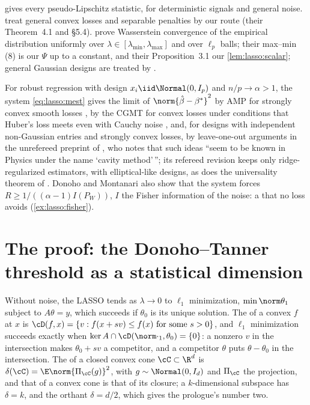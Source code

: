 \begin{refsection}
 gives every pseudo-Lipschitz statistic, for deterministic signals and general noise. \Textcite{ThrampoulidisAbbasiHassibi2018} treat general convex losses and separable penalties by our route (their Theorem~4.1 and \S5.4). \Textcite{MiolaneMontanari2021} prove Wasserstein convergence of the empirical distribution uniformly over $\lambda\in[\lambda_{\min},\lambda_{\max}]$ and over $\ell_p$ balls; their max--min (8) is our $\Psi$ up to a constant, and their Proposition~3.1 our \cref{lem:lasso:scalar}; general Gaussian designs are treated by \textcite{CelentanoMontanariWei2023}.

For robust regression with design $x_i\iid\Normal(0,I_p)$ and $n/p\to\alpha>1$, the system \eqref{eq:lasso:mest} gives the limit of $\norm{\hat\beta-\beta^*}^2$ by AMP for strongly convex smooth losses \parencite[Theorem~4.1]{DonohoMontanari2016}, by the CGMT for convex losses under conditions that Huber's loss meets even with Cauchy noise \parencite[Theorem~4.1, \S5.1]{ThrampoulidisAbbasiHassibi2018}, and, for designs with independent non-Gaussian entries and strongly convex losses, by leave-one-out arguments in the unrefereed preprint of \textcite{ElKaroui2013}, who notes that such ideas ``seem to be known in Physics under the name `cavity method'\,''; its refereed revision \parencite{ElKaroui2018} keeps only ridge-regularized estimators, with elliptical-like designs, as does the universality theorem of \textcite{HanShen2023}. Donoho and Montanari also show that the system forces $R\ge1/((\alpha-1)I(P_W))$, $I$ the Fisher information of the noise: a  that no loss avoids (\cref{ex:lasso:fisher}).

\section{The proof: the Donoho--Tanner threshold as a statistical dimension}\label{sec:lasso:dt}

Without noise, the LASSO tends as $\lambda\to0$ to $\ell_1$ minimization, $\min\norm\theta_1$ subject to $A\theta=y$, which succeeds if $\theta_0$ is its unique solution. The  of a convex $f$ at $x$ is $\cD(f,x)=\{v:f(x+sv)\le f(x)\text{ for some }s>0\}$, and $\ell_1$ minimization succeeds exactly when $\ker A\cap\cD(\norm\cdot_1,\theta_0)=\{0\}$: a nonzero $v$ in the intersection makes $\theta_0+sv$ a competitor, and a competitor $\theta$ puts $\theta-\theta_0$ in the intersection. The  of a closed convex cone $\cC\subset\R^d$ is $\delta(\cC)=\E\norm{\Pi_\cC(g)}^2$, with $g\sim\Normal(0,I_d)$ and $\Pi_\cC$ the projection, and that of a convex cone is that of its closure; a $k$-dimensional subspace has $\delta=k$, and the orthant $\delta=d/2$, which gives the prologue's number two.


\end{refsection}
